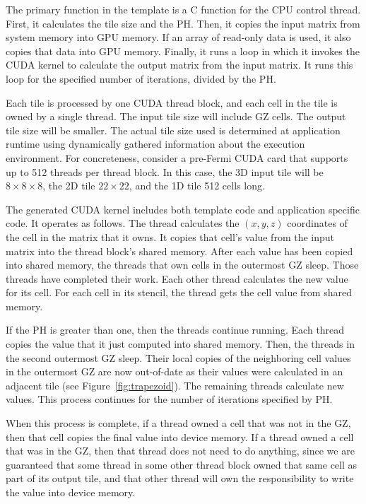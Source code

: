 \documentclass[preprint,nocopyrightspace]{styles/sigplanconf}
\begin{document}
The primary function in the template is a C function for the CPU control
thread.  First, it calculates the tile size and the PH.  
Then, it copies the input matrix from system memory into GPU
memory.  
If an array of read-only data is used, it also
copies that data into GPU memory.
Finally, it runs a loop in which it invokes the CUDA kernel
to calculate the output matrix from the input matrix.  It runs this
loop for the specified number of iterations, divided by the PH.

Each tile is processed by one CUDA thread block, and each cell in the tile
is owned by a single thread.  The input tile size will include GZ cells.
The output tile size will be smaller.  The actual tile size used is
determined at application runtime using dynamically gathered information about
the execution environment.  For concreteness, consider a pre-Fermi
CUDA card that supports up to 512 threads per thread block.  In this case,
the 3D input tile will be $8 \times 8 \times 8$, the 2D tile $22 \times 22$,
and the 1D tile 512 cells long.  

The generated CUDA kernel includes both template code and application specific
code.  It operates as follows.  The thread calculates the $(x, y, z)$
coordinates of the cell in the matrix that it owns.  It copies that cell's
value from the input matrix into the thread block's shared memory.  After each
value has been copied into shared memory, the threads that own cells in the
outermost GZ sleep.  Those threads have completed their work.  Each other
thread calculates the new value for its cell.  For each cell in its stencil,
the thread gets the cell value from shared memory.

If the PH is greater than one, then the threads continue running.  Each thread
copies the value that it just computed into shared memory.  Then, the threads
in the second outermost GZ sleep.  Their local copies of the neighboring
cell values in the outermost GZ are now out-of-date as their values
were calculated in an adjacent tile (see Figure~\ref{fig:trapezoid}).  The
remaining threads calculate new values.  This process continues for the number
of iterations specified by PH.

When this process is complete, if a thread owned a cell that was not
in the GZ, then that cell copies the final value into device
memory.  If a thread owned a cell that was in the GZ, then
that thread does not need to do anything, since we are guaranteed that
some thread in some other thread block owned that same cell as
part of its output tile, and that
other thread will own the responsibility to write the value into
device memory.
\end{document}
